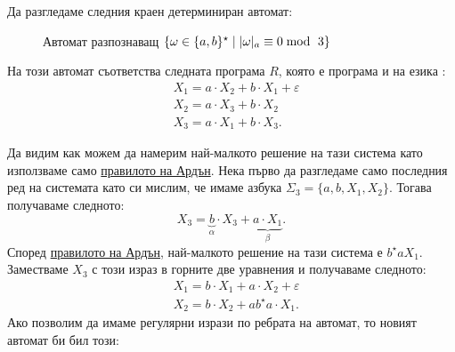 \begin{example}
  Да разгледаме следния краен детерминиран автомат:
  \begin{figure}[H]
    \centering
    \caption{Автомат разпознаващ $\{\omega \in \{a,b\}^\star \mid \abs{\omega}_{a} \equiv 0 \bmod\ 3\}$}
  \end{figure}
  На този автомат съответства следната програма $R$, която е програма и на езика \REGPP:
  \begin{align*}
    & X_1 = a \cdot X_2 + b \cdot X_1 + \varepsilon \\
    & X_2 = a \cdot X_3 + b \cdot X_2\\
    & X_3 = a \cdot X_1 + b \cdot X_3.
  \end{align*}

  Да видим как можем да намерим най-малкото решение на тази система като използваме само \hyperref[prob:reg:arden]{правилото на Ардън}.
  Нека първо да разгледаме само последния ред на системата като си мислим, че имаме азбука $\Sigma_3 = \{a,b,X_1,X_2\}$. Тогава получаваме следното:
  \[X_3 = \underbrace{b}_{\alpha} \cdot X_3 + \underbrace{a \cdot X_1}_{\beta}.\]
  Според \hyperref[prob:reg:arden]{правилото на Ардън}, най-малкото решение на тази система е $b^\star a X_1$.
  Заместваме $X_3$ с този израз в горните две уравнения и получаваме следното:
  \begin{align*}
    & X_1 = b \cdot X_1 + a \cdot X_2 + \varepsilon \\
    & X_2 = b \cdot X_2 + a b^\star a \cdot X_1.
  \end{align*}
  Ако позволим да имаме регулярни изрази по ребрата на автомат, то новият автомат би бил този:


\end{example}
